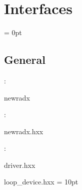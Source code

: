 
\section{Interfaces} 


\parskip = 0pt

\vspace{3mm} \subsection*{General}

: 

newradx
\vspace{2mm}

\vspace{5mm}

: 



newradx.hxx
\vspace{2mm}

: 

driver.hxx

loop\_device.hxx
\vspace{2mm}\parskip = 10pt 
